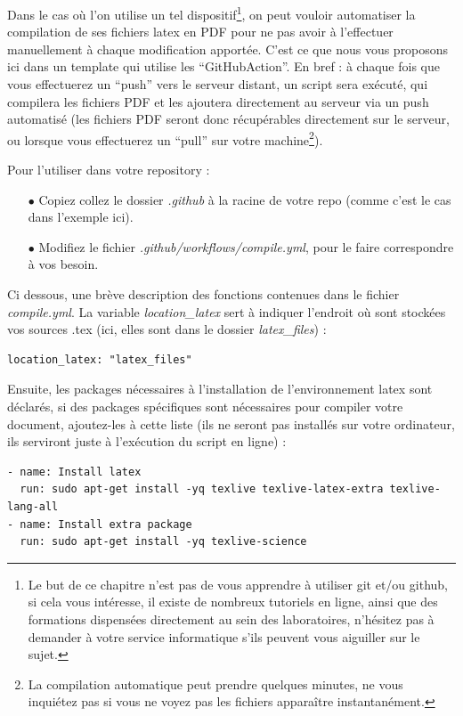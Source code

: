 Dans le cas où l'on utilise un tel dispositif\footnote{Le but de ce chapitre n'est pas de vous apprendre à utiliser git et/ou github, si cela vous intéresse, il existe de nombreux tutoriels en ligne, ainsi que des formations dispensées directement au sein des laboratoires, n'hésitez pas à demander à votre service informatique s'ils peuvent vous aiguiller sur le sujet.}, on peut vouloir automatiser la compilation de ses fichiers latex en PDF pour ne pas avoir à l'effectuer manuellement à chaque modification apportée. C'est ce que nous vous proposons ici dans un template qui utilise les ``GitHubAction''. En bref : à chaque fois que vous effectuerez un ``push'' vers le serveur distant, un script sera exécuté, qui compilera les fichiers PDF et les ajoutera directement au serveur via un push automatisé (les fichiers PDF seront donc récupérables directement sur le serveur, ou lorsque vous effectuerez un ``pull'' sur votre machine\footnote{La compilation automatique peut prendre quelques minutes, ne vous inquiétez pas si vous ne voyez pas les fichiers apparaître instantanément.}). 

Pour l'utiliser dans votre repository :
\begin{itemize}
\item[$\bullet$] Copiez collez le dossier \textit{.github} à la racine de votre repo (comme c'est le cas dans l'exemple ici). 
\item[$\bullet$] Modifiez le fichier \textit{.github/workflows/compile.yml}, pour le faire correspondre à vos besoin.
\end{itemize}

Ci dessous, une brève description des fonctions contenues dans le fichier \textit{compile.yml}.
La variable \textit{location\_{}latex} sert à indiquer l'endroit où sont stockées vos sources .tex (ici, elles sont dans le dossier \textit{latex\_{}files}) :
\begin{lstlisting}
location_latex: "latex_files"
\end{lstlisting}

Ensuite, les packages nécessaires à l'installation de l'environnement latex sont déclarés, si des packages spécifiques sont nécessaires pour compiler votre document, ajoutez-les à cette liste (ils ne seront pas installés sur votre ordinateur, ils serviront juste à l'exécution du script en ligne) :
\begin{lstlisting}
- name: Install latex
  run: sudo apt-get install -yq texlive texlive-latex-extra texlive-lang-all
- name: Install extra package
  run: sudo apt-get install -yq texlive-science
\end{lstlisting}

